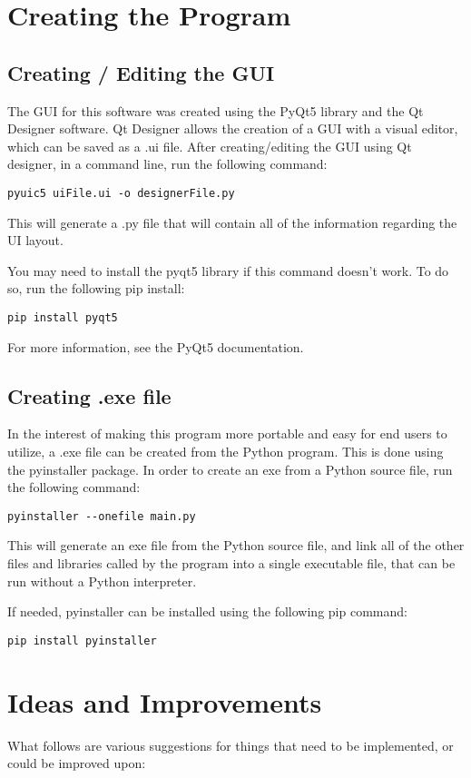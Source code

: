 \documentclass{article}
\begin{document}
\section{Creating the Program}
\subsection{Creating / Editing the GUI}
The GUI for this software was created using the PyQt5 library and the Qt Designer software. Qt Designer allows the creation of a GUI with a visual editor, which can be saved as a .ui file. After creating/editing the GUI using Qt designer, in a command line, run the following command:
\begin{lstlisting}
pyuic5 uiFile.ui -o designerFile.py
\end{lstlisting}
This will generate a .py file that will contain all of the information regarding the UI layout. 

You may need to install the pyqt5 library if this command doesn't work. To do so, run the following pip install:
\begin{lstlisting}
pip install pyqt5
\end{lstlisting}

For more information, see the PyQt5 documentation. 

\subsection{Creating .exe file}
In the interest of making this program more portable and easy for end users to utilize, a .exe file can be created from the Python program. This is done using the pyinstaller package. In order to create an exe from a Python source file, run the following command:
\begin{lstlisting}
pyinstaller --onefile main.py
\end{lstlisting}
This will generate an exe file from the Python source file, and link all of the other files and libraries called by the program into a single executable file, that can be run without a Python interpreter. 

If needed, pyinstaller can be installed using the following pip command:
\begin{lstlisting}
pip install pyinstaller
\end{lstlisting}

\section{Ideas and Improvements}
What follows are various suggestions for things that need to be implemented, or could be improved upon:
\end{document}
